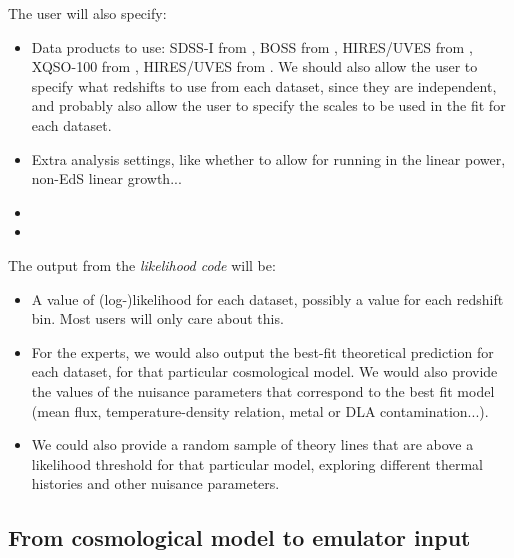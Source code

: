 The user will also specify:
\begin{itemize}
 \item Data products to use: 
  SDSS-I from \cite{McDonald2006}, 
  BOSS from \cite{Palanque-Delabrouille2013},
  HIRES/UVES from \cite{Viel2013},
  XQSO-100 from \cite{Irsic2017}, 
  HIRES/UVES from \cite{Walther2018a}. 
  We should also allow the user to specify what redshifts to use from each
  dataset, since they are independent, and probably also allow the user 
  to specify the scales to be used in the fit for each dataset.
 \item Extra analysis settings, like whether to allow for running in the 
  linear power, non-EdS linear growth...
 \item {}
 \item {}
\end{itemize}

The output from the \textit{likelihood code} will be:
\begin{itemize}
 \item A value of (log-)likelihood for each dataset, possibly a value for 
  each redshift bin. 
  Most users will only care about this.
 \item For the experts, we would also output the best-fit theoretical 
  prediction for each dataset, for that particular cosmological model.
  We would also provide the values of the nuisance parameters that correspond
  to the best fit model (mean flux, temperature-density relation, metal or DLA
  contamination...).
 \item We could also provide a random sample of theory lines that are above a 
  likelihood threshold for that particular model, exploring different 
  thermal histories and other nuisance parameters.
\end{itemize}


\subsection{From cosmological model to emulator input}

